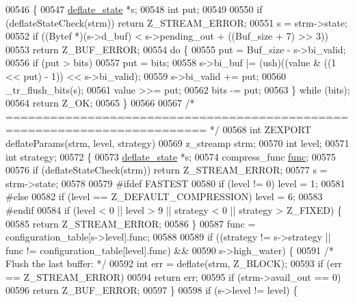 \begin{DoxyCode}
00546 \{
00547     \hyperlink{structinternal__state}{deflate\_state} *s;
00548     \textcolor{keywordtype}{int} put;
00549 
00550     \textcolor{keywordflow}{if} (deflateStateCheck(strm)) \textcolor{keywordflow}{return} Z\_STREAM\_ERROR;
00551     s = strm->state;
00552     \textcolor{keywordflow}{if} ((Bytef *)(s->d\_buf) < s->pending\_out + ((Buf\_size + 7) >> 3))
00553         \textcolor{keywordflow}{return} Z\_BUF\_ERROR;
00554     \textcolor{keywordflow}{do} \{
00555         put = Buf\_size - s->bi\_valid;
00556         \textcolor{keywordflow}{if} (put > bits)
00557             put = bits;
00558         s->bi\_buf |= (ush)((value & ((1 << put) - 1)) << s->bi\_valid);
00559         s->bi\_valid += put;
00560         \_tr\_flush\_bits(s);
00561         value >>= put;
00562         bits -= put;
00563     \} \textcolor{keywordflow}{while} (bits);
00564     \textcolor{keywordflow}{return} Z\_OK;
00565 \}
00566 
00567 \textcolor{comment}{/* ========================================================================= */}
00568 \textcolor{keywordtype}{int} ZEXPORT deflateParams(strm, level, strategy)
00569     z\_streamp strm;
00570     \textcolor{keywordtype}{int} level;
00571     \textcolor{keywordtype}{int} strategy;
00572 \{
00573     \hyperlink{structinternal__state}{deflate\_state} *s;
00574     compress\_func \hyperlink{structfunc}{func};
00575 
00576     \textcolor{keywordflow}{if} (deflateStateCheck(strm)) \textcolor{keywordflow}{return} Z\_STREAM\_ERROR;
00577     s = strm->state;
00578 
00579 \textcolor{preprocessor}{#ifdef FASTEST}
00580     \textcolor{keywordflow}{if} (level != 0) level = 1;
00581 \textcolor{preprocessor}{#else}
00582     \textcolor{keywordflow}{if} (level == Z\_DEFAULT\_COMPRESSION) level = 6;
00583 \textcolor{preprocessor}{#endif}
00584     \textcolor{keywordflow}{if} (level < 0 || level > 9 || strategy < 0 || strategy > Z\_FIXED) \{
00585         \textcolor{keywordflow}{return} Z\_STREAM\_ERROR;
00586     \}
00587     func = configuration\_table[s->level].func;
00588 
00589     \textcolor{keywordflow}{if} ((strategy != s->strategy || func != configuration\_table[level].func) &&
00590         s->high\_water) \{
00591         \textcolor{comment}{/* Flush the last buffer: */}
00592         \textcolor{keywordtype}{int} err = deflate(strm, Z\_BLOCK);
00593         \textcolor{keywordflow}{if} (err == Z\_STREAM\_ERROR)
00594             \textcolor{keywordflow}{return} err;
00595         \textcolor{keywordflow}{if} (strm->avail\_out == 0)
00596             \textcolor{keywordflow}{return} Z\_BUF\_ERROR;
00597     \}
00598     \textcolor{keywordflow}{if} (s->level != level) \{

\end{DoxyCode}
